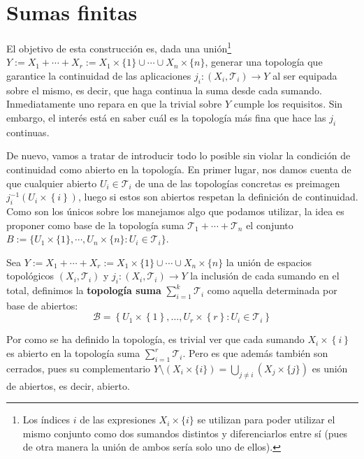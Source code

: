 \section{Sumas finitas}%
\label{sec:sumas_finitas}
El objetivo de esta construcción es, dada una unión\footnote{Los índices $i$ de las expresiones $X_i\times\{i\}$ se utilizan para poder utilizar el mismo conjunto como dos sumandos distintos y diferenciarlos entre sí (pues de otra manera la unión de ambos sería solo uno de ellos).} $Y := X_1 + \cdots + X_r := X_1 \times \{1\} \cup \cdots \cup X_n\times\{n\}$, generar una topología que garantice la continuidad de las aplicaciones $j_i: \left( X_i, \mathcal{T}_i \right) \rightarrow Y$ al ser equipada sobre el mismo, es decir, que haga continua la suma desde cada sumando. Inmediatamente uno repara en que la trivial sobre $Y$ cumple los requisitos. Sin embargo, el interés está en saber cuál es la topología más fina que hace las $j_i$ continuas.

De nuevo, vamos a tratar de introducir todo lo posible sin violar la condición de continuidad como abierto en la topología. En primer lugar, nos damos cuenta de que cualquier abierto $U_i \in \mathcal{T}_i$ de una de las topologías concretas es preimagen $j_i^{-1}\left( U_i \times \left\{ i \right\} \right)$, luego si estos son abiertos respetan la definición de continuidad. Como son los únicos sobre los manejamos algo que podamos utilizar, la idea es proponer como base de la topología suma $\mathcal{T}_1 + \cdots + \mathcal{T}_n$ el conjunto $B := \{U_1\times\{1\}, \cdots, U_n\times\{n\} : U_i \in \mathcal{T}_i\}$.

\begin{defi}
Sea $Y := X_1 + \cdots + X_r := X_1 \times \{1\} \cup \cdots \cup X_n\times\{n\}$ la unión de espacios topológicos $(X_i, \mathcal{T}_i)$ y $j_i: \left( X_i, \mathcal{T}_i \right) \rightarrow Y$ la inclusión de cada sumando en el total, definimos la \textbf{topología suma} $\sum_{i=1}^{k} \mathcal{T}_i$ como aquella determinada por base de abiertos:
\[
\mathcal{B} = \left\{ U_1 \times \left\{ 1 \right\}, \ldots, U_r \times \left\{ r \right\}: U_i \in \mathcal{T}_i \right\}
\]
\end{defi}

\begin{obs}
Por como se ha definido la topología, es trivial ver que cada sumando $X_i \times \left\{ i \right\}$  es abierto en la topología suma $\sum_{i=1}^{r} \mathcal{T}_i$. Pero es que además también son cerrados, pues su complementario $Y \setminus (X_i \times \{i\}) = \bigcup_{j \neq i} (X_j \times\{j\})$ es unión de abiertos, es decir, abierto.
\end{obs}

